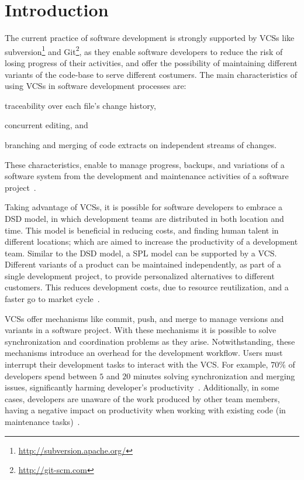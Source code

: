 
\section{Introduction}
\label{sec:introduction}

The current practice of software development is strongly supported by \acp{VCS} like subversion\footnote{\url{http://subversion.apache.org/}} and Git\footnote{\url{http://git-scm.com}}, as they enable software developers to reduce the risk of losing progress of their activities, and offer the possibility of maintaining different variants of the code-base to serve different costumers.
The main characteristics of using \acp{VCS} in software development processes are:
\begin{enumerate*}[label=(\arabic*)]
\item traceability over each file's change history, 
\item concurrent editing, and 
\item branching and merging of code extracts on independent streams of changes. 
\end{enumerate*}
These characteristics, enable to manage progress, backups, and variations of a software system from the development and maintenance activities of a software project~\cite{spinellis05}.

Taking advantage of \acp{VCS},  it is possible for software developers to embrace a \ac{DSD} model, in which development teams are distributed in both location and time. This model is beneficial in reducing costs, and finding human talent in different locations; which are aimed to increase the productivity of a development team. 
Similar to the \ac{DSD} model, a \ac{SPL} model can be supported by a \ac{VCS}. Different variants of a product can be maintained independently, as part of a single development project, to provide personalized alternatives to different customers. This reduces development costs, due to resource reutilization, and a faster go to market cycle~\cite{pohl05}.  

\acp{VCS} offer mechanisms like commit, push, and merge to manage versions and variants in a software project. With these mechanisms it is possible to solve synchronization and coordination problems as they arise. 
Notwithstanding, these mechanisms introduce an overhead for the development workflow. Users must interrupt their development tasks to interact with the \ac{VCS}. For example, $70\%$ of developers spend between $5$ and  $20$ minutes solving synchronization and merging issues, significantly harming developer's productivity~\cite{estler14}. Additionally, in some cases, developers are unaware of the work produced by other team members, having a negative impact on productivity when working with existing code (\eg in maintenance tasks)~\cite{dourish92}.

